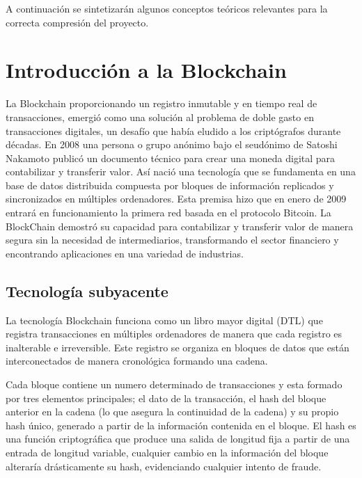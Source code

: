 
A continuación se sintetizarán algunos conceptos teóricos relevantes para la correcta compresión del proyecto.



\section{Introducción a la Blockchain}

La Blockchain proporcionando un registro inmutable y en tiempo real de transacciones, emergió como una solución al problema de doble gasto en transacciones digitales, un desafío que había eludido a los criptógrafos durante décadas.
En 2008 una persona o grupo anónimo bajo el seudónimo de Satoshi Nakamoto publicó un documento técnico para crear una moneda digital para contabilizar y transferir valor. Así nació una tecnología que se fundamenta en una base de datos distribuida compuesta por bloques de información replicados y sincronizados en múltiples ordenadores.  
Esta premisa hizo que en enero de 2009 entrará en funcionamiento la primera red basada en el protocolo Bitcoin.
La BlockChain demostró su capacidad para contabilizar y transferir valor de manera segura sin la necesidad de intermediarios, transformando el sector financiero y encontrando aplicaciones en una variedad de industrias.


\subsection{Tecnología subyacente}

La tecnología Blockchain funciona como un libro mayor digital (DTL) que registra transacciones en múltiples ordenadores de manera que cada registro es inalterable e irreversible. Este registro se organiza en bloques de datos que están interconectados de manera cronológica formando una cadena.

Cada bloque contiene un numero determinado de transacciones y esta formado por tres elementos principales; el dato de la transacción, el hash del bloque anterior en la cadena (lo que asegura la continuidad de la cadena) y su propio hash único, generado a partir de la información contenida en el bloque.
El hash es una función criptográfica que produce una salida de longitud fija a partir de una entrada de longitud variable, cualquier cambio en la información del bloque alteraría drásticamente su hash, evidenciando cualquier intento de fraude.

